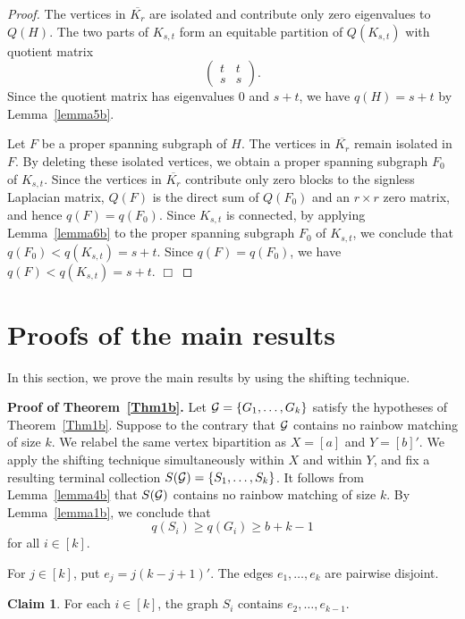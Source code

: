 \documentclass[11pt,a4paper]{article}
\theoremstyle{definition}
\newtheorem{claim}{Claim}
\numberwithin{equation}{section}
\def\qed{\hfill$\Box$\vspace{12pt}}
\begin{document}
\begin{proof}
The vertices in $\overline{K_r}$ are isolated and contribute only zero eigenvalues to $Q(H)$. The two parts of $K_{s,t}$ form an equitable partition of $Q(K_{s,t})$ with quotient matrix
\[
\begin{pmatrix}
t&t\\
s&s
\end{pmatrix}.
\]
Since the quotient matrix has eigenvalues $0$ and $s+t$, we have $q(H)=s+t$ by Lemma~\ref{lemma5b}.

Let $F$ be a proper spanning subgraph of $H$. The vertices in $\overline{K_r}$ remain isolated in $F$. By deleting these isolated vertices, we obtain a proper spanning subgraph $F_0$ of $K_{s,t}$. Since the vertices in $\overline{K_r}$ contribute only zero blocks to the signless Laplacian matrix, $Q(F)$ is the direct sum of $Q(F_0)$ and an $r\times r$ zero matrix, and hence $q(F)=q(F_0)$. Since $K_{s,t}$ is connected, by applying Lemma~\ref{lemma6b} to the proper spanning subgraph $F_0$ of $K_{s,t}$, we conclude that $q(F_0)<q(K_{s,t})=s+t$. Since $q(F)=q(F_0)$, we have $q(F)<q(K_{s,t})=s+t$. \qed
\end{proof}

\section{Proofs of the main results}
In this section, we prove the main results by using the shifting technique.

\noindent \textbf{Proof of Theorem~\ref{Thm1b}.}
Let ${\cal G}=\{G_1,\ldots,G_k\}$ satisfy the hypotheses of Theorem~\ref{Thm1b}. Suppose to the contrary that ${\cal G}$ contains no rainbow matching of size $k$. We relabel the same vertex bipartition as $X=[a]$ and $Y=[b]'$. We apply the shifting technique simultaneously within $X$ and within $Y$, and fix a resulting terminal collection $S({\cal G})=\{S_1,\ldots,S_k\}$. It follows from Lemma~\ref{lemma4b} that $S({\cal G})$ contains no rainbow matching of size $k$. By Lemma~\ref{lemma1b}, we conclude that
\begin{equation}
\label{eq:shift-lower}
q(S_i)\ge q(G_i)\ge b+k-1
\end{equation}
for all $i\in[k]$.

For $j\in[k]$, put $e_j=j(k-j+1)'$. The edges $e_1,\ldots,e_k$ are pairwise disjoint.

\begin{claim}\label{claim1a}
For each $i\in[k]$, the graph $S_i$ contains $e_2,\ldots,e_{k-1}$.
\end{claim}
\end{document}
